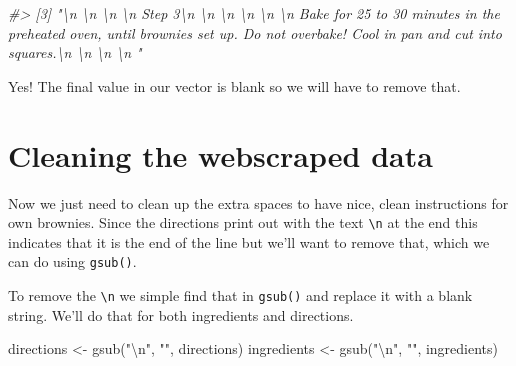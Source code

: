 \documentclass[
  12pt,
]{book}
\newenvironment{Shaded}{\begin{snugshade}}{\end{snugshade}}
\newcommand{\CommentTok}[1]{\textcolor[rgb]{0.37,0.37,0.37}{\textit{#1}}}
\newcommand{\FunctionTok}[1]{\textcolor[rgb]{0,0,0}{#1}}
\newcommand{\NormalTok}[1]{#1}
\newcommand{\OtherTok}[1]{\textcolor[rgb]{0.37,0.37,0.37}{#1}}
\newcommand{\SpecialCharTok}[1]{\textcolor[rgb]{0,0,0}{#1}}
\newcommand{\StringTok}[1]{\textcolor[rgb]{0.5,0.5,0.5}{#1}}
\begin{document}
\begin{Shaded}
\begin{Highlighting}[]
\CommentTok{\#\textgreater{} [3] "\textbackslash{}n                                    \textbackslash{}n                                      \textbackslash{}n                                        \textbackslash{}n                                          Step 3\textbackslash{}n                                        \textbackslash{}n                                      \textbackslash{}n                                    \textbackslash{}n                                      \textbackslash{}n                                        \textbackslash{}n                                          Bake for 25 to 30 minutes in the preheated oven, until brownies set up. Do not overbake! Cool in pan and cut into squares.\textbackslash{}n                                        \textbackslash{}n                                        \textbackslash{}n                                      \textbackslash{}n                                  "}
\end{Highlighting}
\end{Shaded}

Yes! The final value in our vector is blank so we will have to remove that.

\hypertarget{cleaning-the-webscraped-data}{%
\section{Cleaning the webscraped data}\label{cleaning-the-webscraped-data}}

Now we just need to clean up the extra spaces to have nice, clean instructions for own brownies. Since the directions print out with the text \texttt{\textbackslash{}n} at the end this indicates that it is the end of the line but we'll want to remove that, which we can do using \texttt{gsub()}.

To remove the \texttt{\textbackslash{}n} we simple find that in \texttt{gsub()} and replace it with a blank string. We'll do that for both ingredients and directions.

\begin{Shaded}
\begin{Highlighting}[]
\NormalTok{directions }\OtherTok{\textless{}{-}} \FunctionTok{gsub}\NormalTok{(}\StringTok{"}\SpecialCharTok{\textbackslash{}n}\StringTok{"}\NormalTok{, }\StringTok{""}\NormalTok{, directions)}
\NormalTok{ingredients }\OtherTok{\textless{}{-}} \FunctionTok{gsub}\NormalTok{(}\StringTok{"}\SpecialCharTok{\textbackslash{}n}\StringTok{"}\NormalTok{, }\StringTok{""}\NormalTok{, ingredients)}
\end{Highlighting}
\end{Shaded}
\end{document}
